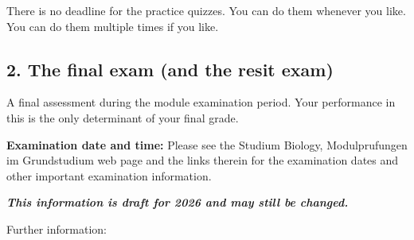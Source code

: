 \documentclass[
  letterpaper,
  8pt,
  a4paper]{book}
\begin{document}
There is no deadline for the practice quizzes. You can do them whenever
you like. You can do them multiple times if you like.

\subsection*{2. The final exam (and the resit
exam)}\label{the-final-exam-and-the-resit-exam}

A final assessment during the module examination period. Your
performance in this is the only determinant of your final grade.

\textbf{Examination date and time:} Please see the Studium Biology,
Modulprufungen im Grundstudium web page and the links therein for the
examination dates and other important examination information.

\textbf{\emph{This information is draft for 2026 and may still be
changed.}}

Further information:
\end{document}
